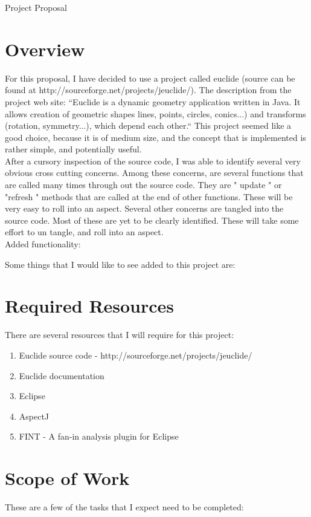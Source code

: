 \documentclass{article}
\begin{document}
Project Proposal

\section{Overview}

For this proposal, I have decided to use a project called euclide (source can be found at http://sourceforge.net/projects/jeuclide/). The description from the project web site: ``Euclide is a dynamic geometry application written in Java. It allows creation of geometric shapes lines, points, circles, conics...) and transforms (rotation, symmetry...), which depend each other.`` This project seemed like a good choice, because it is of medium size, and the concept that is implemented is rather simple, and potentially useful. \\

After a cursory inspection of the source code, I was able to identify several very obvious cross cutting concerns. Among these concerns, are several functions that are called many times through out the source code. They are " update " or "refresh " methods that are called at the end of other functions. These will be very easy to roll into an aspect. Several other concerns are tangled into the source code. Most of these are yet to be clearly identified. These will take some effort to un tangle, and roll into an aspect. \\

Added functionality:
 
Some things that I would like to see added to this project are: 

\section{Required Resources}
There are several resources that I will require for this project:
\begin{enumerate}

\item Euclide source code - http://sourceforge.net/projects/jeuclide/
\item Euclide documentation 
\item Eclipse
\item AspectJ
\item FINT - A fan-in analysis plugin for Eclipse

\end{enumerate}


\section{Scope of Work}
These are a few of the tasks that I expect need to be completed:
\end{document}
